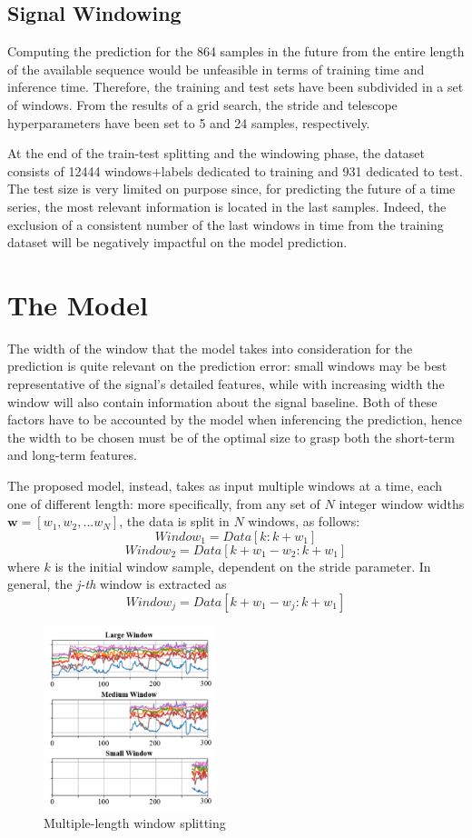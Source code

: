 \documentclass[conference]{IEEEtran}
\begin{document}
\subsection{Signal Windowing}
    Computing the prediction for the 864 samples in the future from the entire length of the available sequence would be unfeasible in terms of training time and inference time. Therefore, the training and test sets have been subdivided in a set of windows.
    From the results of a grid search, the stride and telescope hyperparameters have been set to 5 and 24 samples, respectively. 
    
    At the end of the train-test splitting and the windowing phase, the dataset consists of 12444 windows+labels dedicated to training and 931 dedicated to test. The test size is very limited on purpose since, for predicting the future of a time series, the most relevant information is located in the last samples. Indeed, the exclusion of a consistent number of the last windows in time from the training dataset will be negatively impactful on the model prediction.

\section{The Model}
    The width of the window that the model takes into consideration for the prediction is quite relevant on the prediction error: small windows may be best representative of the signal's detailed features, while with increasing width the window will also contain information about the signal baseline. Both of these factors have to be accounted by the model when inferencing the prediction, hence the width to be chosen must be of the optimal size to grasp both the short-term and long-term features. 

    The proposed model, instead, takes as input multiple windows at a time, each  one of different length: more specifically, from any set of  $N$ integer window widths $\textbf{w}=[w_1, w_2, ... w_N]$, the data is split in $N$ windows, as follows:
    $$Window_1 = Data[k : k+w_1]$$
    $$Window_2 = Data[k+w_1-w_2 : k+w_1]$$
    where $k$ is the initial window sample, dependent on the stride parameter. In general, the \textit{j-th} window is extracted as
    $$Window_j = Data[k+w_1-w_j : k+w_1]$$
    
    \begin{figure}[h!]
        \includegraphics[width=0.45\textwidth]{windows.png}
        \caption{Multiple-length window splitting}
        \label{fig:windows}
    \end{figure}
    
\end{document}
